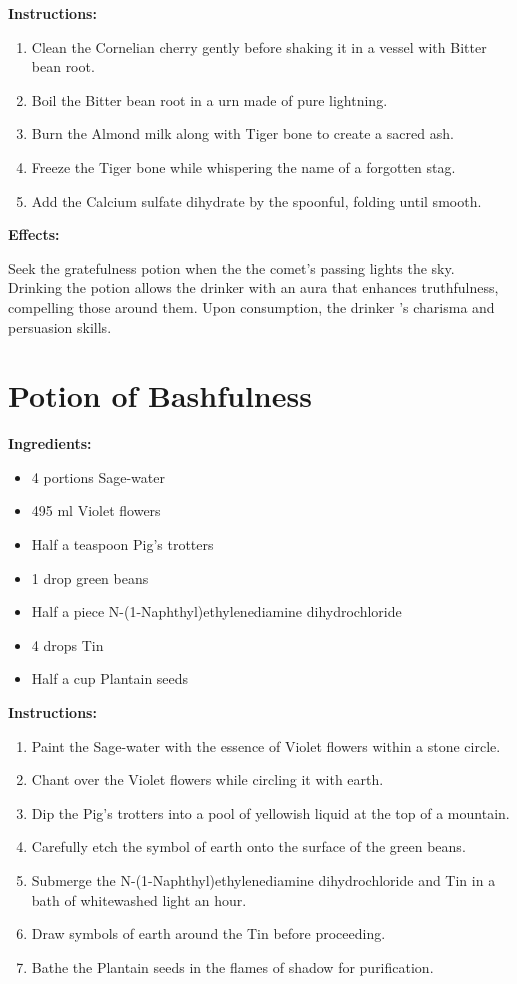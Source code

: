 \documentclass{article}
\begin{document}
\textbf{Instructions:}

\begin{enumerate}
  \item Clean the Cornelian cherry gently before shaking it in a vessel with Bitter bean root.
  \item Boil the Bitter bean root in a urn made of pure lightning.
  \item Burn the Almond milk along with Tiger bone to create a sacred ash.
  \item Freeze the Tiger bone while whispering the name of a forgotten stag.
  \item Add the Calcium sulfate dihydrate by the spoonful, folding until smooth.
\end{enumerate}

\textbf{Effects:}

Seek the gratefulness potion when the the comet’s passing lights the sky. Drinking the potion allows the drinker with an aura that enhances truthfulness, compelling those around them. Upon consumption, the drinker 's charisma and persuasion skills.

\newpage
\section*{Potion of Bashfulness}

\textbf{Ingredients:}

\begin{itemize}
  \item 4 portions Sage-water
  \item 495 ml Violet flowers
  \item Half a teaspoon Pig's trotters
  \item 1 drop green beans
  \item Half a piece N-(1-Naphthyl)ethylenediamine dihydrochloride
  \item 4 drops Tin
  \item Half a cup Plantain seeds
\end{itemize}

\textbf{Instructions:}

\begin{enumerate}
  \item Paint the Sage-water with the essence of Violet flowers within a stone circle.
  \item Chant over the Violet flowers while circling it with earth.
  \item Dip the Pig's trotters into a pool of yellowish liquid at the top of a mountain.
  \item Carefully etch the symbol of earth onto the surface of the green beans.
  \item Submerge the N-(1-Naphthyl)ethylenediamine dihydrochloride and Tin in a bath of whitewashed light an hour.
  \item Draw symbols of earth around the Tin before proceeding.
  \item Bathe the Plantain seeds in the flames of shadow for purification.
\end{enumerate}
\end{document}
